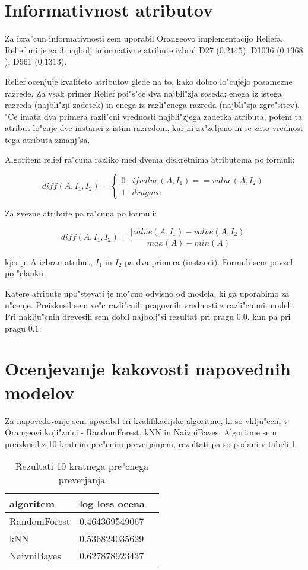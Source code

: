 \documentclass[a4paper,11pt]{article}
\begin{document}
\section{Informativnost atributov}

Za izra"cun informativnosti sem uporabil Orangeovo implementacijo Reliefa. Relief mi je za 3 najbolj informativne atribute izbral D27 ($0.2145$), D1036 ($0.1368$), D961 ($0.1313$). 

Relief ocenjuje kvaliteto atributov glede na to, kako dobro lo"cujejo posamezne razrede. Za vsak primer Relief poi"s"ce dva najbli"zja soseda; enega iz istega razreda (najbli"zji zadetek) in enega iz razli"cnega razreda (najbli"zja zgre"sitev). "Ce imata dva primera razli"cni vrednosti najbli"zjega zadetka atributa, potem ta atribut lo"cuje dve instanci z istim razredom, kar ni za"zeljeno in se zato vrednost tega atributa zmanj"sa.

Algoritem relief ra"cuna razliko med dvema diskretnima atributoma po formuli:

\[ diff(A, I_1, I_2) = \left\{
	\begin{array}{ll}
		0  & if value(A,I_1) == value(A, I_2) \\
		1 & drugace
	\end{array}
\right. \]

Za zvezne atribute pa ra"cuna po formuli:

\[ diff(A, I_1, I_2) = \frac{\vert value(A,I_1) - value(A, I_2) \vert}{max(A) - min(A)} \]

kjer je A izbran atribut, $I_1$ in $I_2$ pa dva primera (instanci). Formuli sem povzel po "clanku \cite{relief}

Katere atribute upo"stevati je mo"cno odvisno od modela, ki ga uporabimo za u"cenje. Preizkusil sem ve"c razli"cnih pragovnih vrednosti z razli"cnimi modeli. Pri naklju"cnih drevesih sem dobil najbolj"si rezultat pri pragu $0.0$, knn pa pri pragu $0.1$. 



\section{Ocenjevanje kakovosti napovednih modelov}

Za napovedovanje sem uporabil tri kvalifikacijske algoritme, ki so vklju"ceni v Orangeovi knji"znici - RandomForest, kNN in NaivniBayes. Algoritme sem preizkusil z 10 kratnim pre"cnim preverjanjem, rezultati pa so podani v tabeli \ref{rez}.

\begin{table}[htbp]
\caption{Rezultati 10 kratnega pre"cnega preverjanja}
\label{rez}
\begin{center}
\begin{tabular}{llp{3cm}}
\hline
algoritem & log loss ocena \\
\hline
RandomForest & 0.464369549067 \\
kNN & 0.536824035629 \\
NaivniBayes & 0.627878923437\\
\hline
\end{tabular}
\end{center}
\end{table}
\end{document}
